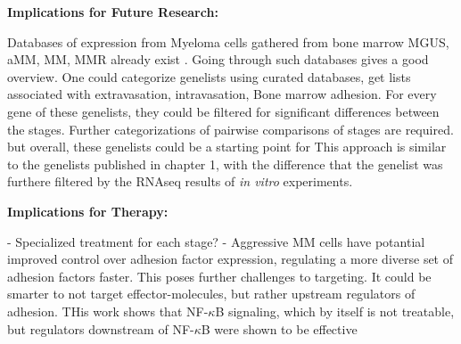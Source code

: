 \textbf{Implications for Future Research:}

Databases of expression from Myeloma cells gathered from bone
marrow \ac{MGUS}, \ac{aMM}, \ac{MM}, \ac{MMR} already exist
\citet{akhmetzyanovaDynamicCD138Surface2020,
      seckingerCD38ImmunotherapeuticTarget2018}. Going through such databases gives a
good overview. One could categorize genelists using curated databases, get lists
associated with extravasation, intravasation, Bone marrow adhesion. For every
gene of these genelists, they could be filtered for significant differences
between the stages. Further categorizations of pairwise comparisons of stages
are required. but overall, these genelists could be a starting point for This
approach is similar to the genelists published in chapter 1, with the difference
that the genelist was furthere filtered by the RNAseq results of \textit{in
      vitro} experiments.


\textbf{Implications for Therapy:}

- Specialized treatment for each stage?
- Aggressive MM cells have potantial improved control over adhesion factor
expression, regulating a more diverse set of adhesion factors faster. This poses
further challenges to targeting. It could be smarter to not target
effector-molecules, but rather upstream regulators of adhesion. THis work shows
that NF-$\kappa$B signaling, which by itself is not treatable, but regulators
downstream of NF-$\kappa$B were shown to be effective
\cite{adamikEZH2HDAC1Inhibition2017, adamikXRK3F2InhibitionP62ZZ2018}

















